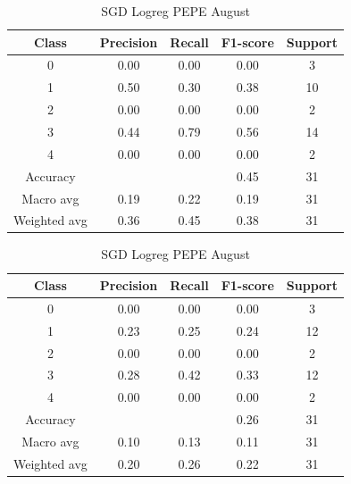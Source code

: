 \begin{enumerate}
\begin{enumerate}
                \begin{table}[H]
                \centering
                \scriptsize
                \begin{minipage}{0.48\textwidth}
                \centering
                \begin{tabular}{c|cccc}
                \hline
                Class & Precision & Recall & F1-score & Support \\
                \hline
                0 & 0.00 & 0.00 & 0.00 & 3 \\
                1 & 0.50 & 0.30 & 0.38 & 10 \\
                2 & 0.00 & 0.00 & 0.00 & 2 \\
                3 & 0.44 & 0.79 & 0.56 & 14 \\
                4 & 0.00 & 0.00 & 0.00 & 2 \\
                \hline
                Accuracy &       &      & 0.45 & 31 \\
                Macro avg & 0.19 & 0.22 & 0.19 & 31 \\
                Weighted avg & 0.36 & 0.45 & 0.38 & 31 \\
                \hline
                \end{tabular}
                \caption{SGD Logreg DOGE August}
                \label{tab:classifier_2_report_sgd_logreg_doge_non_filtered_aug}
                \end{minipage}
                \hfill
                \begin{minipage}{0.48\textwidth}
                \centering
                \begin{tabular}{c|cccc}
                \hline
                Class & Precision & Recall & F1-score & Support \\
                \hline
                0 & 0.00 & 0.00 & 0.00 & 3 \\
                1 & 0.23 & 0.25 & 0.24 & 12 \\
                2 & 0.00 & 0.00 & 0.00 & 2 \\
                3 & 0.28 & 0.42 & 0.33 & 12 \\
                4 & 0.00 & 0.00 & 0.00 & 2 \\
                \hline
                Accuracy &       &      & 0.26 & 31 \\
                Macro avg & 0.10 & 0.13 & 0.11 & 31 \\
                Weighted avg & 0.20 & 0.26 & 0.22 & 31 \\
                \hline
                \end{tabular}
                \caption{SGD Logreg PEPE August}
                \label{tab:classifier_2_report_sgd_logreg_pepe_non_filtered_aug}
                \end{minipage}
                

\end{table}
\end{enumerate}
\end{enumerate}
